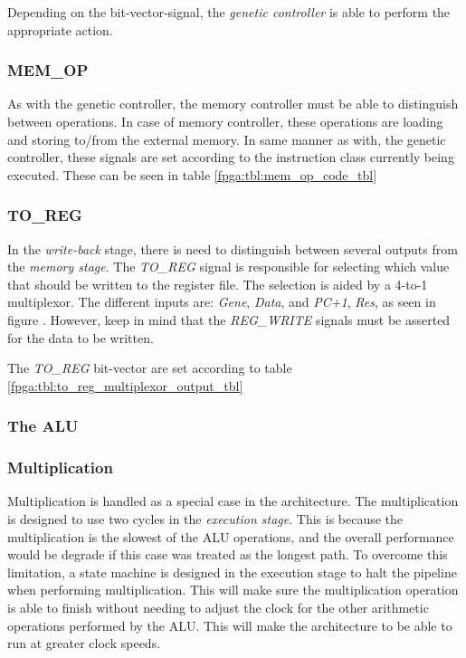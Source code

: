 

Depending on the bit-vector-signal, the \emph{genetic controller} is able to perform the appropriate action. 


\subsubsection{MEM\_OP}
As with the genetic controller, the memory controller must be able to distinguish between operations. In case of memory controller, these operations are loading and storing to/from the external memory. In same manner as with, the genetic controller, these signals are set according to the instruction class currently being executed. These can be seen in table \ref{fpga:tbl:mem_op_code_tbl}




\subsubsection{TO\_REG}
In the \emph{write-back} stage, there is need to distinguish between several outputs from the \emph{memory stage}. The \emph{TO\_REG} signal is responsible for selecting which value that should be written to the register file. The selection is aided by a 4-to-1 multiplexor. The different inputs are: \emph{Gene}, \emph{Data}, and \emph{PC+1}, \emph{Res}, as seen in figure . However, keep in mind that the \emph{REG\_WRITE} signals must be asserted for the data to be written. 

The \emph{TO\_REG} bit-vector are set according to table \ref{fpga:tbl:to_reg_multiplexor_output_tbl}







\subsubsection{The ALU}


\subsubsection{Multiplication}
Multiplication is handled as a special case in the architecture. The multiplication is designed to use two cycles in the \emph{execution stage}. This is because the multiplication is the slowest of the ALU operations, and the overall performance would be degrade if this case was treated as the longest path. To overcome this limitation, a state machine is designed in the execution stage to halt the pipeline when performing multiplication. This will make sure the multiplication operation is able to finish without needing to adjust the clock for the other arithmetic operations performed by the ALU. This will make the architecture to be able to run at greater clock speeds. 



